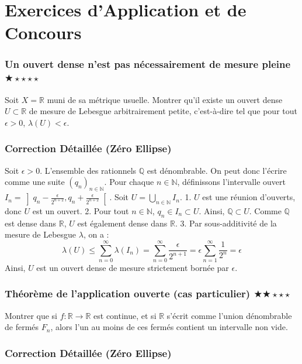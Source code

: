\documentclass[11pt,a4paper]{article}
\begin{document}
\part{Exercices d'Application et de Concours}

\section{Un ouvert dense n'est pas nécessairement de mesure pleine \quad $\bigstar\star\star\star\star$}

Soit $X = \mathbb{R}$ muni de sa métrique usuelle. Montrer qu'il existe un ouvert dense $U \subset \mathbb{R}$ de mesure de Lebesgue arbitrairement petite, c'est-à-dire tel que pour tout $\epsilon > 0$, $\lambda(U) < \epsilon$.

\section{Correction Détaillée (Zéro Ellipse)}


Soit $\epsilon > 0$. L'ensemble des rationnels $\mathbb{Q}$ est dénombrable. On peut donc l'écrire comme une suite $(q_n)_{n \in \mathbb{N}}$.
Pour chaque $n \in \mathbb{N}$, définissons l'intervalle ouvert $I_n = \left] q_n - \frac{\epsilon}{2^{n+2}}, q_n + \frac{\epsilon}{2^{n+2}} \right[$.
Soit $U = \bigcup_{n \in \mathbb{N}} I_n$.
1. $U$ est une réunion d'ouverts, donc $U$ est un ouvert.
2. Pour tout $n \in \mathbb{N}$, $q_n \in I_n \subset U$. Ainsi, $\mathbb{Q} \subset U$. Comme $\mathbb{Q}$ est dense dans $\mathbb{R}$, $U$ est également dense dans $\mathbb{R}$.
3. Par sous-additivité de la mesure de Lebesgue $\lambda$, on a :
   $$ \lambda(U) \leq \sum_{n=0}^{\infty} \lambda(I_n) = \sum_{n=0}^{\infty} \frac{\epsilon}{2^{n+1}} = \epsilon \sum_{n=1}^{\infty} \frac{1}{2^n} = \epsilon $$
Ainsi, $U$ est un ouvert dense de mesure strictement bornée par $\epsilon$.


\newpage

\section{Théorème de l'application ouverte (cas particulier) \quad $\bigstar\bigstar\star\star\star$}

Montrer que si $f: \mathbb{R} \to \mathbb{R}$ est continue, et si $\mathbb{R}$ s'écrit comme l'union dénombrable de fermés $F_n$, alors l'un au moins de ces fermés contient un intervalle non vide.

\section{Correction Détaillée (Zéro Ellipse)}
\end{document}
